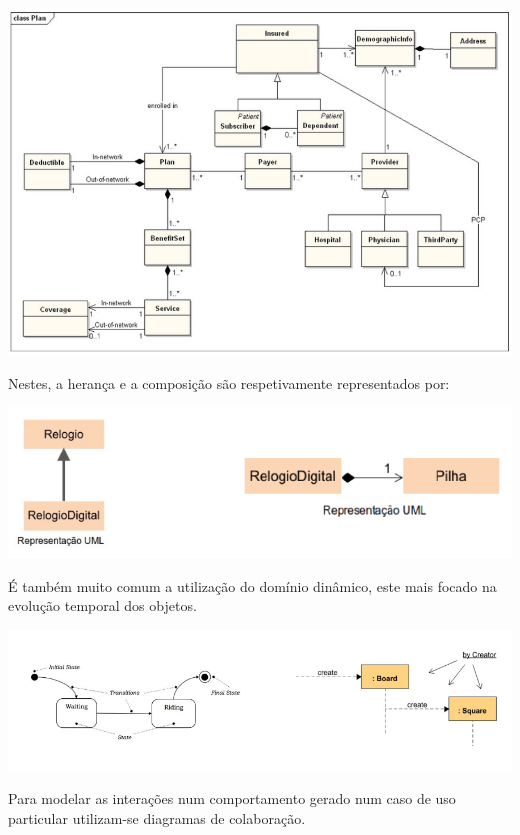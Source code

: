 \documentclass{article}
\begin{document}
\begin{center}
    \includegraphics[scale=0.3]{Images/6.png}
\end{center}

Nestes, a herança e a composição são respetivamente representados por:

\begin{center}
    \includegraphics[scale=0.4]{Images/7.png}
\end{center}

É também muito comum a utilização do domínio dinâmico, este mais focado na
evolução temporal dos objetos.

\begin{center}
    \includegraphics[scale=0.4]{Images/8.png}
\end{center}    


\pagebreak

Para modelar as interações num comportamento gerado num caso de uso particular
utilizam-se diagramas de colaboração.
\end{document}

